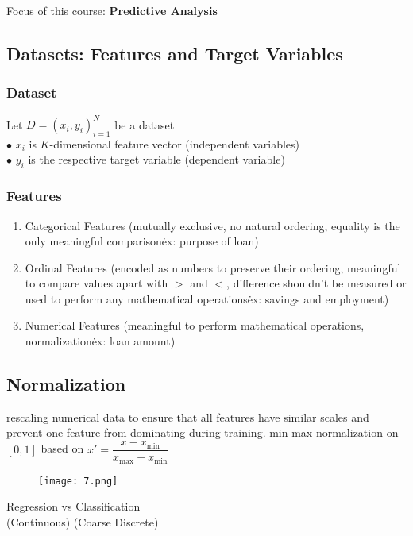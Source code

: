 \documentclass{article}
\begin{document}
\newpage 
\pagestyle{otherpages}
\large
Focus of this course: \textbf{Predictive Analysis} \\[1mm]
\subsection*{Datasets: Features and Target Variables}
\subsubsection*{Dataset}
Let $D = {{(x_i,y_i)}^{N}_{i=1}}$ be a dataset\\
$\bullet$ $x_i$ is $K$-dimensional feature vector (independent variables)\\
$\bullet$ $y_i$ is the respective target variable (dependent variable)

\subsubsection*{Features}
\begin{enumerate}
	\item Categorical Features (mutually exclusive, no natural ordering, equality is the only meaningful comparison\. ex: purpose of loan)
	\item Ordinal Features (encoded as numbers to preserve their ordering, meaningful to compare values apart with $>$ and $<$, difference shouldn't be measured or used to perform any mathematical operations\. ex: savings and employment)
	\item Numerical Features (meaningful to perform mathematical operations, normalization\. ex: loan amount)
\end{enumerate}


\subsection*{Normalization}
rescaling numerical data to ensure that all features have similar scales and prevent one feature from dominating during training.
min-max normalization on $[0,1]$ based on $x' = \dfrac{x - x_{\text{min}}}{x_{\text{max}}-x_{\text{min}}}$
\\[5mm]
\begin{figure}[h]
	\centering 
	\texttt{[image: 7.png]}
\end{figure}
\vspace{2mm}
\hspace*{55mm} Regression \hspace{5mm} vs \hspace{5mm} Classification \\
\hspace*{55mm} (Continuous)\hspace{10mm} (Coarse Discrete)
\end{document}
